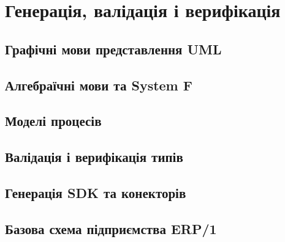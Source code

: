 \chapter{Генерація, валідація і верифікація}

\section{Графічні мови представлення UML}

\section{Алгебраїчні мови та System F}

\section{Моделі процесів}

\section{Валідація і верифікація типів}

\section{Генерація SDK та конекторів}

\section{Базова схема підприємства ERP/1}

